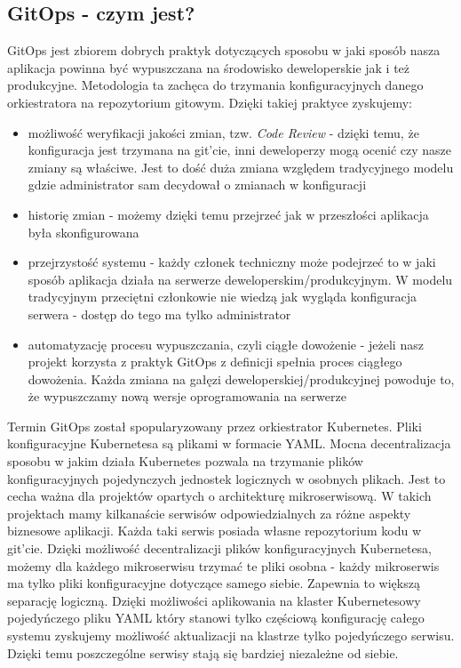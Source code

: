 \subsection{GitOps - czym jest?}
GitOps jest zbiorem dobrych praktyk dotyczących sposobu w jaki sposób nasza aplikacja powinna być wypuszczana na środowisko deweloperskie jak i też produkcyjne. Metodologia ta zachęca do trzymania konfiguracyjnych danego orkiestratora na repozytorium gitowym. Dzięki takiej praktyce zyskujemy:
\begin{itemize}
    \item możliwość weryfikacji jakości zmian, tzw. \textit{Code Review} - dzięki temu, że konfiguracja jest trzymana na git'cie, inni deweloperzy mogą ocenić czy nasze zmiany są właściwe. Jest to dość duża zmiana względem tradycyjnego modelu gdzie administrator sam decydował o zmianach w konfiguracji
    \item historię zmian - możemy dzięki temu przejrzeć jak w przeszłości aplikacja była skonfigurowana
    \item przejrzystość systemu - każdy członek techniczny może podejrzeć to w jaki sposób aplikacja działa na serwerze deweloperskim/produkcyjnym. W modelu tradycyjnym przeciętni członkowie nie wiedzą jak wygląda konfiguracja serwera - dostęp do tego ma tylko administrator
    \item automatyzację procesu wypuszczania, czyli ciągłe dowożenie - jeżeli nasz projekt korzysta z praktyk GitOps z definicji spełnia proces ciągłego dowożenia. Każda zmiana na gałęzi deweloperskiej/produkcyjnej powoduje to, że wypuszczamy nową wersje oprogramowania na serwerze
\end{itemize}
\par
Termin GitOps został spopularyzowany przez orkiestrator Kubernetes. Pliki konfiguracyjne Kubernetesa są plikami w formacie YAML. Mocna decentralizacja sposobu w jakim działa Kubernetes pozwala na trzymanie plików konfiguracyjnych pojedynczych jednostek logicznych w osobnych plikach. Jest to cecha ważna dla projektów opartych o architekturę mikroserwisową. W takich projektach mamy kilkanaście serwisów odpowiedzialnych za różne aspekty biznesowe aplikacji. Każda taki serwis posiada własne repozytorium kodu w git'cie. Dzięki możliwość decentralizacji plików konfiguracyjnych Kubernetesa, możemy dla każdego mikroserwisu trzymać te pliki osobna - każdy mikroserwis ma tylko pliki konfiguracyjne dotyczące samego siebie. Zapewnia to większą separację logiczną. Dzięki możliwości aplikowania na klaster Kubernetesowy pojedyńczego pliku YAML który stanowi tylko częściową konfigurację całego systemu zyskujemy możliwość aktualizacji na klastrze tylko pojedyńczego serwisu. Dzięki temu poszczególne serwisy stają się bardziej niezależne od siebie.
